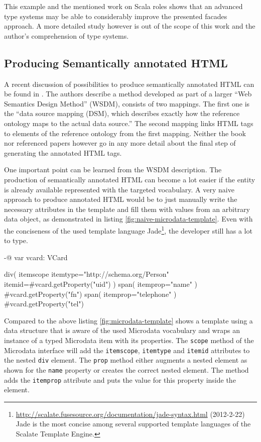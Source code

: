 \documentclass[12pt,a4paper,twoside]{scrartcl}		%
\newcommand{\citeurl}[2]{\url{#1} (#2)}
\begin{document}
This example and the mentioned work on Scala roles shows that an advanced type
systems may be able to considerably improve the presented facades approach. A
more detailed study however is out of the scope of this work and the author's
comprehension of type systems.


\subsection{Producing Semantically annotated HTML}

A recent discussion of possibilities to produce semantically annotated HTML can
be found in \cite[sec. 9.1.3]{DBLP:books/daglib/0023755}. The authors describe a
method developed as part of a larger ``Web Semantics Design Method'' (WSDM),
consists of two mappings. The first one is the ``data source mapping (DSM),
which describes exactly how the reference ontology maps to the actual data
source.''  The second mapping links HTML tags to elements of the reference
ontology from the first mapping. Neither the book nor referenced papers however
go in any more detail about the final step of generating the annotated HTML
tags.

One important point can be learned from the WSDM description. The production of
semantically annotated HTML can become a lot easier if the entity is already
available represented with the targeted vocabulary. A very naive approach to
produce annotated HTML would be to just manually write the necessary attributes
in the template and fill them with values from an arbitrary data object, as
demonstrated in listing \ref{fig:naive-microdata-template}. Even with the
conciseness of the used template language
Jade\footnote{\citeurl{http://scalate.fusesource.org/documentation/jade-syntax.html}{2012-2-22}
  Jade is the most concise among several supported template languages of the
  Scalate Template Engine.}, the developer still has a lot to type.

\begin{anylisting}[label=fig:naive-microdata-template,
                   caption={Defining all Microdata attributes manually in an HTML template}]
-@ var vcard: VCard

div( itemscope itemtype="http://schema.org/Person" 
     itemid=#{vcard.getProperty("uid")} )
  span( itemprop="name" )
    #{vcard.getProperty("fn")}
  span( itemprop="telephone" ) 
    #{vcard.getProperty("tel")}
\end{anylisting}

Compared to the above listing \ref{fig:microdata-template} shows a template
using a data structure that is aware of the used Microdata vocabulary and wraps
an instance of a typed Microdata item with its properties. The
\lstinline:scope: method of the Microdata interface will add the
\lstinline:itemscope:, \lstinline:itemtype: and \lstinline:itemid: attributes to
the nested \lstinline:div: element. The \lstinline:prop: method either augments
a nested element as shown for the \lstinline:name: property or creates the
correct nested element. The method adds the \lstinline:itemprop: attribute and
puts the value for this property inside the element.
\end{document}
